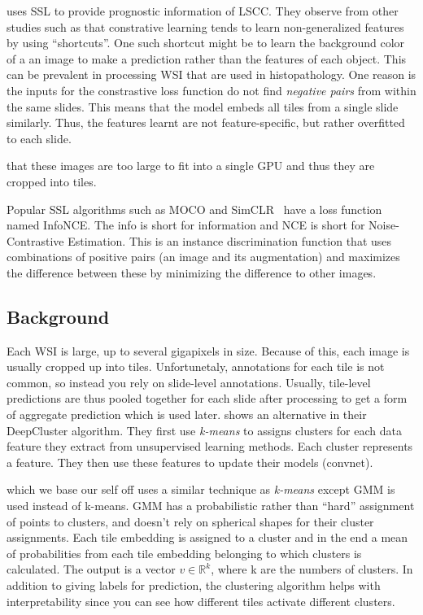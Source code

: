 \documentclass[10pt,twocolumn,letterpaper]{article}
\begin{document}
\cite{sslUMAP} uses \gls{SSL} to provide prognostic information of \gls{LSCC}. They observe from other studies such as \cite{contrastiveShortcut} that constrative learning tends to learn non-generalized features by using ``shortcuts''. One such shortcut might be to learn the background color of a an image to make a prediction rather than the features of each object. This can be prevalent in processing \gls{WSI} that are used in histopathology. One reason is the inputs for the constrastive loss function do not find \textit{negative pairs} from within the same slides. This means that the model embeds all tiles from a single slide similarly. Thus, the features learnt are not feature-specific, but rather overfitted to each slide. 

that these images are too large to fit into a single \gls{GPU} and thus they are cropped into tiles.  

Popular \gls{SSL} algorithms such as \gls{MOCO} and SimCLR~\cite{simCLR} have a loss function named InfoNCE. The info is short for information and NCE is short for Noise-Contrastive Estimation. This is an instance discrimination function that uses combinations of positive pairs (an image and its augmentation) and maximizes the difference between these by minimizing the difference to other images. 

\subsection{Background}
Each \gls{WSI} is large, up to several gigapixels in size. Because of this, each image is usually cropped up into tiles. Unfortunetaly, annotations for each tile is not common, so instead you rely on slide-level annotations. Usually, tile-level predictions are thus pooled together for each slide after processing to get a form of aggregate prediction which is used later. \cite{unsupervisedClustering} shows an alternative in their DeepCluster algorithm. They first use \textit{k-means} to assigns clusters for each data feature they extract from unsupervised learning methods. Each cluster represents a feature. They then use these features to update their models (convnet). 

\cite{sslUMAP} which we base our self off uses a similar technique as \textit{k-means} except \gls{GMM} is used instead of k-means. \gls{GMM} has a probabilistic rather than ``hard'' assignment of points to clusters, and doesn't rely on spherical shapes for their cluster assignments. Each tile embedding is assigned to a cluster and in the end a mean of probabilities from each tile embedding belonging to which clusters is calculated. The output is a vector $v \in \mathbb{R}^{k}$, where k are the numbers of clusters. 
In addition to giving labels for prediction, the clustering algorithm helps with interpretability since you can see how different tiles activate different clusters.
\end{document}
